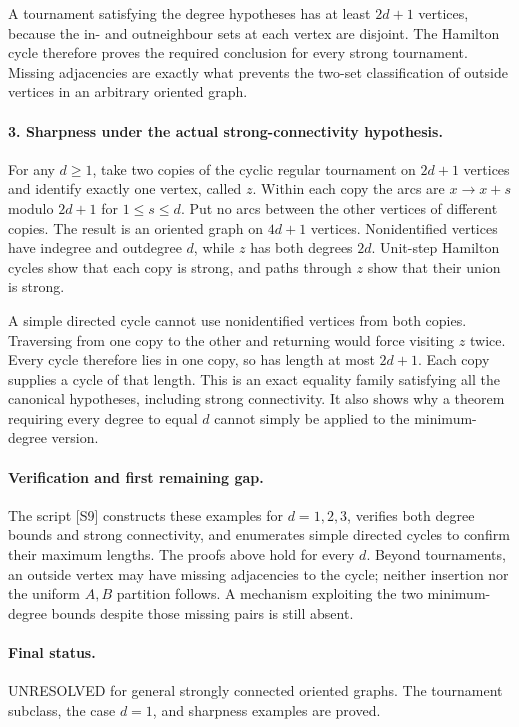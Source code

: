 \documentclass[11pt,a4paper]{article}
\begin{document}
A tournament satisfying the degree hypotheses has at least $2d+1$
vertices, because the in- and outneighbour sets at each vertex are
disjoint. The Hamilton cycle therefore proves the required conclusion
for every strong tournament. Missing adjacencies are exactly what
prevents the two-set classification of outside vertices in an
arbitrary oriented graph.

\paragraph{3. Sharpness under the actual strong-connectivity hypothesis.}
For any $d\ge1$, take two copies of the cyclic regular tournament
on $2d+1$ vertices and identify exactly one vertex, called $z$.
Within each copy the arcs are $x\to x+s$ modulo $2d+1$ for
$1\le s\le d$. Put no arcs between the other vertices of different
copies. The result is an oriented graph on $4d+1$ vertices.
Nonidentified vertices have indegree and outdegree $d$, while $z$
has both degrees $2d$. Unit-step Hamilton cycles show that each
copy is strong, and paths through $z$ show that their union is strong.

A simple directed cycle cannot use nonidentified vertices from both
copies. Traversing from one copy to the other and returning would
force visiting $z$ twice. Every cycle therefore lies in one copy,
so has length at most $2d+1$. Each copy supplies a cycle of that
length. This is an exact equality family satisfying all the
canonical hypotheses, including strong connectivity. It also shows
why a theorem requiring every degree to equal $d$ cannot simply be
applied to the minimum-degree version.

\paragraph{Verification and first remaining gap.}
The script [S9] constructs these examples for $d=1,2,3$, verifies
both degree bounds and strong connectivity, and enumerates simple
directed cycles to confirm their maximum lengths. The proofs above
hold for every $d$. Beyond tournaments, an outside vertex may have
missing adjacencies to the cycle; neither insertion nor the uniform
$A,B$ partition follows. A mechanism exploiting the two minimum-degree
bounds despite those missing pairs is still absent.

\paragraph{Final status.}
UNRESOLVED for general strongly connected oriented graphs. The
tournament subclass, the case $d=1$, and sharpness examples are proved.
\end{document}
